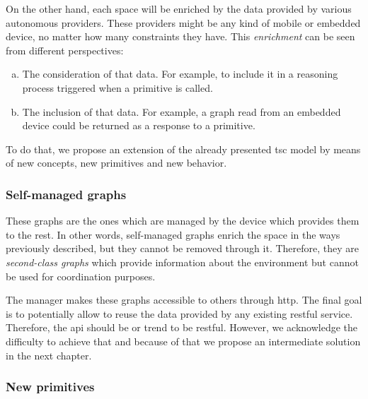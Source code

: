 On the other hand, each space will be enriched by the data provided by various autonomous providers.
These providers might be any kind of mobile or embedded device, no matter how many constraints they have.
This \emph{enrichment} can be seen from different perspectives:
\begin{enumerate}[(a)]
  \item The consideration of that data.
	For example, to include it in a reasoning process triggered when a primitive is called.
  \item The inclusion of that data.
        For example, a graph read from an embedded device could be returned as a response to a primitive.
\end{enumerate}


To do that, we propose an extension of the already presented \ac{tsc} model by means of new concepts, new primitives and new behavior.


\subsubsection{Self-managed graphs}

These graphs are the ones which are managed by the device which provides them to the rest.
In other words, self-managed graphs enrich the space in the ways previously described, but they cannot be removed through it.
Therefore, they are \emph{second-class graphs} which provide information about the environment but cannot be used for coordination purposes.

The manager makes these graphs accessible to others through \acs{http}.
The final goal is to potentially allow to reuse the data provided by any existing \ac{rest}ful service. %
Therefore, the \ac{api} should be or trend to be \ac{rest}ful.
However, we acknowledge the difficulty to achieve that and because of that we propose an intermediate solution in the next chapter.


\subsubsection{New primitives}



